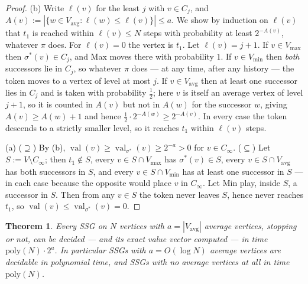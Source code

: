 \documentclass[11pt]{article}
\theoremstyle{plain}
\newtheorem{theorem}{Theorem}[section]
\theoremstyle{definition}
\DeclareMathOperator{\val}{val}
\newcommand{\Vmax}{V_{\max}}
\newcommand{\Vmin}{V_{\min}}
\newcommand{\Vavg}{V_{\mathrm{avg}}}
\begin{document}
\begin{proof}
(b) Write $\ell(v)$ for the least $j$ with $v\in C_j$, and
$A(v):=|\{w\in\Vavg:\ell(w)\le\ell(v)\}|\le a$. We show by induction on
$\ell(v)$ that $t_1$ is reached within $\ell(v)\le N$ steps with
probability at least $2^{-A(v)}$, whatever $\pi$ does. For $\ell(v)=0$
the vertex is $t_1$. Let $\ell(v)=j+1$. If $v\in\Vmax$ then
$\sigma^\ast(v)\in C_j$, and Max moves there with probability $1$. If
$v\in\Vmin$ then \emph{both} successors lie in $C_j$, so whatever $\pi$
does --- at any time, after any history --- the token moves to a vertex
of level at most $j$. If $v\in\Vavg$ then at least one successor lies in
$C_j$ and is taken with probability $\tfrac12$; here $v$ is itself an
average vertex of level $j+1$, so it is counted in $A(v)$ but not in
$A(w)$ for the successor $w$, giving $A(v)\ge A(w)+1$ and hence
$\tfrac12\cdot2^{-A(w)}\ge2^{-A(v)}$. In every case the token descends to
a strictly smaller level, so it reaches $t_1$ within $\ell(v)$ steps.

(a) ($\supseteq$) By (b), $\val(v)\ge\val_{\sigma^\ast}(v)\ge2^{-a}>0$ for
$v\in C_\infty$. ($\subseteq$) Let $S:=V\setminus C_\infty$; then
$t_1\notin S$, every $v\in S\cap\Vmax$ has $\sigma^\ast(v)\in S$, every
$v\in S\cap\Vavg$ has both successors in $S$, and every $v\in S\cap\Vmin$
has at least one successor in $S$ --- in each case because the opposite
would place $v$ in $C_\infty$. Let Min play, inside $S$, a successor in
$S$. Then from any $v\in S$ the token never leaves $S$, hence never
reaches $t_1$, so $\val(v)\le\val_{\sigma^\ast}(v)=0$.
\end{proof}

\begin{theorem}\label{thm:few-avg}
Every SSG on $N$ vertices with $a=|\Vavg|$ average vertices, stopping or
not, can be decided --- and its exact value vector computed --- in time
$\mathrm{poly}(N)\cdot 2^{a}$. In particular SSGs with $a=O(\log N)$
average vertices are decidable in polynomial time, and SSGs with no
average vertices at all in time $\mathrm{poly}(N)$.
\end{theorem}
\end{document}
